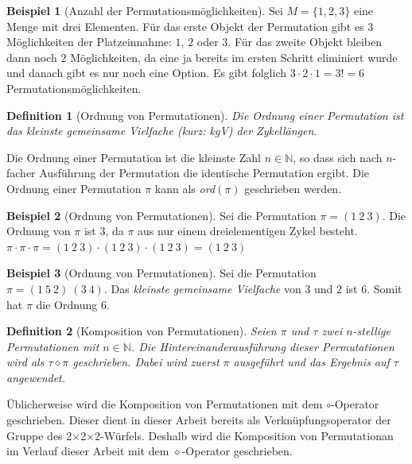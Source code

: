 \documentclass[12pt,a4paper, usenames, dvipsnames]{article}
\theoremstyle{mystyle}
\newtheorem{definition}{Definition}
\theoremstyle{definition}
\newtheorem{bsp}{Beispiel}[definition]
\newcommand{\Ttwo}{2$\times$2$\times$2-}
\begin{document}
\begin{bsp}[Anzahl der Permutationsmöglichkeiten]
Sei $M = \{ 1, 2,3  \}$ eine Menge mit drei Elementen. Für das erste Objekt der Permutation gibt es $3$ Möglichkeiten der Platzeinnahme: $1$, $2$ oder $3$. Für das zweite Objekt bleiben dann noch $2$ Möglichkeiten, da eine ja bereits im ersten Schritt eliminiert wurde und danach gibt es nur noch eine Option. Es gibt folglich $3 \cdot 2 \cdot 1 = 3! = 6$ Permutationsmöglichkeiten.

\end{bsp}

\begin{definition}[Ordnung von Permutationen]

Die Ordnung einer Permutation ist das kleinste gemeinsame Vielfache (kurz: kgV) der Zykellängen.

\end{definition}

Die Ordnung einer Permutation ist die kleinste Zahl $n \in \mathbb{N}$, so dass sich nach $n$-facher Ausführung der Permutation die identische Permutation ergibt. Die Ordnung einer Permutation $\pi$ kann als \textit{ord}$(\pi)$ geschrieben werden.

\begin{bsp}[Ordnung von Permutationen]

Sei die Permutation $\pi = (1 \ 2 \ 3)$. Die Ordnung von $\pi$ ist 3, da $\pi$ aus nur einem dreielementigen Zykel besteht. $\pi \cdot \pi \cdot \pi = (1 \ 2 \ 3) \cdot (1 \ 2 \ 3) \cdot (1 \ 2 \ 3) =  (1 \ 2 \ 3) $

\end{bsp}

\begin{bsp}[Ordnung von Permutationen]

Sei die Permutation $\pi = (1 \ 5 \ 2)\ (3 \ 4)$. Das \textit{kleinste gemeinsame Vielfache} von $3$ und $2$ ist 6. Somit hat $\pi$ die Ordnung 6.

\end{bsp}

\begin{definition}[Komposition von Permutationen]
Seien $\pi$ und $\tau$ zwei $n$-stellige Permutationen mit $n \in \mathbb{N}$. Die Hintereinanderausführung dieser Permutationen wird als $\tau \diamond \pi$ geschrieben. Dabei wird zuerst $\pi$ ausgeführt und das Ergebnis auf $\tau$ angewendet.
\end{definition}
Üblicherweise wird die Komposition von Permutationen mit dem $\circ$-Operator geschrieben. Dieser dient in dieser Arbeit bereits als Verknüpfungsoperator der Gruppe des \Ttwo Würfels. Deshalb wird die Komposition von Permutationan im Verlauf dieser Arbeit mit dem $\diamond$-Operator geschrieben.
\end{document}
